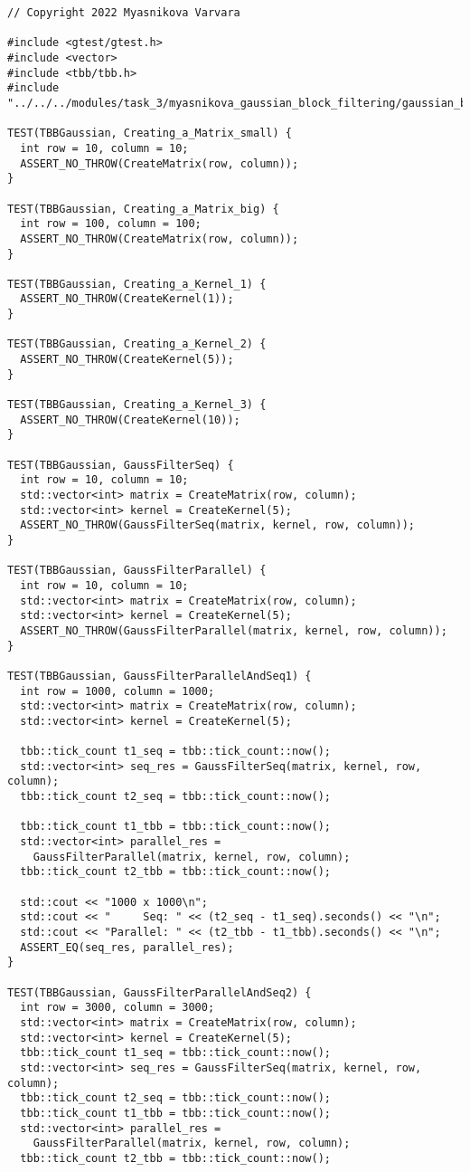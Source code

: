 \documentclass{report}
\begin{document}
\begin{lstlisting}
// Copyright 2022 Myasnikova Varvara

#include <gtest/gtest.h>
#include <vector>
#include <tbb/tbb.h>
#include "../../../modules/task_3/myasnikova_gaussian_block_filtering/gaussian_block_filtering.h"

TEST(TBBGaussian, Creating_a_Matrix_small) {
  int row = 10, column = 10;
  ASSERT_NO_THROW(CreateMatrix(row, column));
}

TEST(TBBGaussian, Creating_a_Matrix_big) {
  int row = 100, column = 100;
  ASSERT_NO_THROW(CreateMatrix(row, column));
}

TEST(TBBGaussian, Creating_a_Kernel_1) {
  ASSERT_NO_THROW(CreateKernel(1));
}

TEST(TBBGaussian, Creating_a_Kernel_2) {
  ASSERT_NO_THROW(CreateKernel(5));
}

TEST(TBBGaussian, Creating_a_Kernel_3) {
  ASSERT_NO_THROW(CreateKernel(10));
}

TEST(TBBGaussian, GaussFilterSeq) {
  int row = 10, column = 10;
  std::vector<int> matrix = CreateMatrix(row, column);
  std::vector<int> kernel = CreateKernel(5);
  ASSERT_NO_THROW(GaussFilterSeq(matrix, kernel, row, column));
}

TEST(TBBGaussian, GaussFilterParallel) {
  int row = 10, column = 10;
  std::vector<int> matrix = CreateMatrix(row, column);
  std::vector<int> kernel = CreateKernel(5);
  ASSERT_NO_THROW(GaussFilterParallel(matrix, kernel, row, column));
}

TEST(TBBGaussian, GaussFilterParallelAndSeq1) {
  int row = 1000, column = 1000;
  std::vector<int> matrix = CreateMatrix(row, column);
  std::vector<int> kernel = CreateKernel(5);

  tbb::tick_count t1_seq = tbb::tick_count::now();
  std::vector<int> seq_res = GaussFilterSeq(matrix, kernel, row, column);
  tbb::tick_count t2_seq = tbb::tick_count::now();

  tbb::tick_count t1_tbb = tbb::tick_count::now();
  std::vector<int> parallel_res =
    GaussFilterParallel(matrix, kernel, row, column);
  tbb::tick_count t2_tbb = tbb::tick_count::now();

  std::cout << "1000 x 1000\n";
  std::cout << "     Seq: " << (t2_seq - t1_seq).seconds() << "\n";
  std::cout << "Parallel: " << (t2_tbb - t1_tbb).seconds() << "\n";
  ASSERT_EQ(seq_res, parallel_res);
}

TEST(TBBGaussian, GaussFilterParallelAndSeq2) {
  int row = 3000, column = 3000;
  std::vector<int> matrix = CreateMatrix(row, column);
  std::vector<int> kernel = CreateKernel(5);
  tbb::tick_count t1_seq = tbb::tick_count::now();
  std::vector<int> seq_res = GaussFilterSeq(matrix, kernel, row, column);
  tbb::tick_count t2_seq = tbb::tick_count::now();
  tbb::tick_count t1_tbb = tbb::tick_count::now();
  std::vector<int> parallel_res =
    GaussFilterParallel(matrix, kernel, row, column);
  tbb::tick_count t2_tbb = tbb::tick_count::now();


\end{lstlisting}
\end{document}
